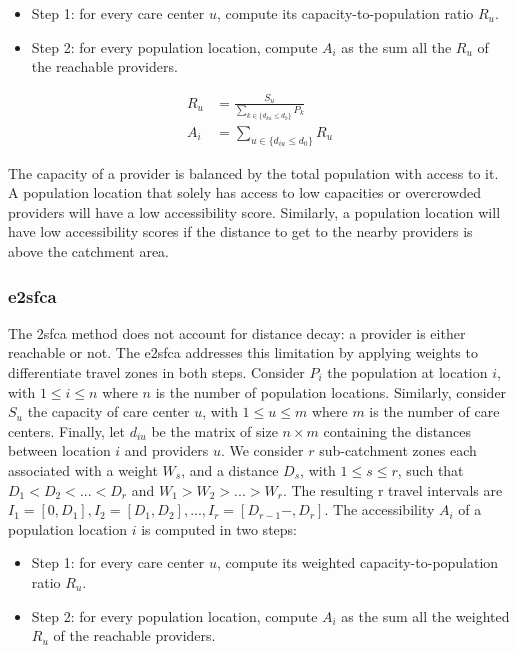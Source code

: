 \begin{itemize}
    \item Step 1: for every care center $u$, compute its
          capacity-to-population ratio $R_u$.
    \item Step 2: for every population location, compute $A_i$ as the sum all
          the $R_u$ of the reachable providers.
\end{itemize}

\begin{align}
    R_u & =  \frac{S_u}{ \sum_{k \in \{ d_{ku} \leq d_0 \}  } P_k } \\
    A_i & = \sum_{u \in \{ d_{iu} \leq d_0 \} } R_u
\end{align}

The capacity of a provider is balanced by the total population with access to
it. A population location that solely has access to low capacities or
overcrowded providers will have a low accessibility score. Similarly, a
population location will have low accessibility scores if the distance to get to
the nearby providers is above the catchment area.

\subsubsection{\acf{e2sfca}}

The \ac{2sfca} method does not account for distance decay: a provider is either
reachable or not. The \ac{e2sfca} \cite{luo_enhanced_2009} addresses this
limitation by applying weights to differentiate travel zones in both steps.
Consider $P_i$ the population at location $i$, with $1 \leq i \leq n$ where $n$
is the number of population locations. Similarly, consider $S_u$ the capacity of
care center $u$, with $1 \leq u \leq m$ where $m$ is the number of care centers.
Finally, let $d_{iu}$ be the matrix of size $n \times m$ containing the
distances between location $i$ and providers $u$. We consider $r$ sub-catchment
zones each associated with a weight $W_s$, and a distance $D_s$, with $1 \leq s
    \leq r$, such that $D_1 < D_2 < ... < D_r$ and $W_1 > W_2 > ... > W_r$. The
resulting r travel intervals are $I_1=[0, D_1], I_2=[D_1, D_2 ], ...
    ,I_r=[D_{r-1}-,D_r]$. The accessibility $A_i$ of a population location $i$ is
computed in two steps:

\begin{itemize}
    \item Step 1: for every care center $u$, compute its weighted
          capacity-to-population ratio $R_u$.
    \item Step 2: for every population location, compute $A_i$ as the sum all
          the weighted $R_u$ of the reachable providers.
\end{itemize}

